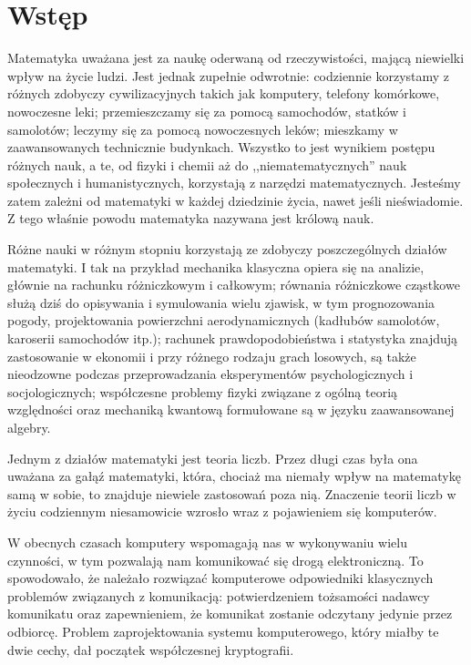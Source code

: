 \chapter*{Wstęp}

Matematyka uważana jest za naukę oderwaną od rzeczywistości,
mającą niewielki wpływ na życie ludzi.
Jest jednak zupełnie odwrotnie:
codziennie korzystamy z różnych zdobyczy cywilizacyjnych
takich jak komputery, telefony komórkowe, nowoczesne leki;
przemieszczamy się za pomocą samochodów, statków i samolotów;
leczymy się za pomocą nowoczesnych leków;
mieszkamy w zaawansowanych technicznie budynkach.
Wszystko to jest wynikiem postępu różnych nauk,
a te, od fizyki i chemii
aż do ,,niematematycznych'' nauk społecznych i humanistycznych,
korzystają z narzędzi matematycznych.
Jesteśmy zatem zależni od matematyki w każdej dziedzinie życia,
nawet jeśli nieświadomie.
Z tego właśnie powodu matematyka nazywana jest królową nauk.

Różne nauki w różnym stopniu korzystają ze zdobyczy
poszczególnych działów matematyki.
I tak na przykład
mechanika klasyczna opiera się na analizie,
głównie na rachunku różniczkowym i całkowym;
równania różniczkowe cząstkowe służą dziś
do opisywania i symulowania wielu zjawisk,
w tym prognozowania pogody, projektowania powierzchni aerodynamicznych
(kadłubów samolotów, karoserii samochodów itp.);
rachunek prawdopodobieństwa i statystyka
znajdują zastosowanie w ekonomii i przy różnego rodzaju grach losowych,
są także nieodzowne
podczas przeprowadzania eksperymentów psychologicznych i socjologicznych;
współczesne problemy fizyki
związane z ogólną teorią względności oraz mechaniką kwantową
formułowane są w języku zaawansowanej algebry.

Jednym z działów matematyki jest teoria liczb.
Przez długi czas była ona uważana za gałąź matematyki,
która, chociaż ma niemały wpływ na matematykę samą w sobie,
to znajduje niewiele zastosowań poza nią.
Znaczenie teorii liczb w życiu codziennym
niesamowicie wzrosło wraz z pojawieniem się komputerów.

W obecnych czasach komputery wspomagają nas w wykonywaniu wielu czynności,
w tym pozwalają nam komunikować się drogą elektroniczną.
To spowodowało, że należało rozwiązać komputerowe odpowiedniki
klasycznych problemów związanych z komunikacją:
potwierdzeniem tożsamości nadawcy komunikatu
oraz zapewnieniem, że komunikat zostanie odczytany jedynie przez odbiorcę.
Problem zaprojektowania systemu komputerowego,
który miałby te dwie cechy,
dał początek współczesnej kryptografii.

